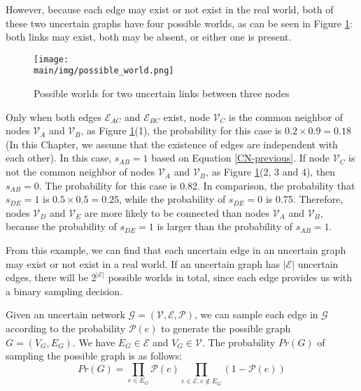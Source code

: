 \documentclass[\main/thesis.tex]{subfiles}
\begin{document}
However, because each edge may exist or not exist in the real world, both of these two uncertain graphs have four possible worlds, as can be seen in Figure \ref{possible-world-link}: both links may exist, both may be absent, or either one is present.

\begin{figure}
\texttt{[image: \\main/img/possible\_world.png]}
\centering
\caption{Possible worlds for two uncertain links between three nodes}
\label{possible-world-link}
\end{figure}

Only when both edges $\mathcal{E}_{AC}$ and $\mathcal{E}_{BC}$ exist, node $\mathcal{V}_C$ is the common neighbor of nodes $\mathcal{V}_A$ and $\mathcal{V}_B$, as Figure \ref{possible-world-link}(1), the probability for this case is $0.2\times 0.9=0.18$ (In this Chapter, we assume that the existence of edges are independent with each other). In this case, $s_{AB}=1$ based on Equation \ref{CN-previous}. If node $\mathcal{V}_C$ is not the common neighbor of nodes $\mathcal{V}_A$ and $\mathcal{V}_B$, as Figure \ref{possible-world-link}(2, 3 and 4),  then $s_{AB}=0$. The probability for this case is 0.82. In comparison, the probability that $s_{DE}=1$ is $0.5\times 0.5=0.25$, while the probability of $s_{DE}=0$ is 0.75. Therefore, nodes $\mathcal{V}_D$ and $\mathcal{V}_E$ are more likely to be connected than nodes $\mathcal{V}_A$ and $\mathcal{V}_B$, because the probability of $s_{DE}=1$ is larger than the probability of $s_{AB}=1$. 

From this example, we can find that each uncertain edge in an uncertain graph may exist or not exist in a real world. If an uncertain graph has $|\mathcal{E}|$ uncertain edges, there will be $2^{|\mathcal{E}|}$ possible worlds in total, since each edge provides us with a binary sampling decision.

Given an uncertain network $\mathcal{G = (V,E,P)}$, we can sample each edge in $\mathcal{G}$ according to the probability $\mathcal{P}(e)$ to generate the possible graph $G = (V_G,E_G)$. We have $E_G \in \mathcal{E}$ and $V_G \in \mathcal{V}$. The probability $Pr(G)$ of sampling the possible graph is as follows:
\begin{equation}
Pr(G) = \prod_{e\in E_G}\mathcal{P}(e)\prod_{e\in \mathcal{E}, e\notin E_G}(1-\mathcal{P}(e))
\label{probability-of-possible-world}
\end{equation}
\end{document}
